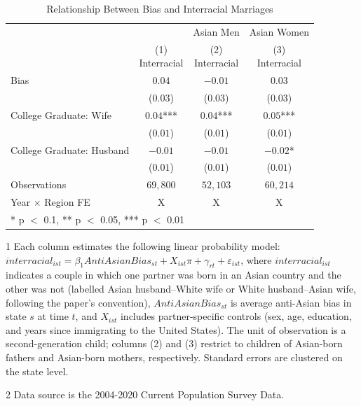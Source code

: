 \begin{table}[H]
\centering\centering
\caption{Relationship Between Bias and Interracial Marriages \label{regtab-logit-02}}
\centering
\begin{threeparttable}
\begin{tabular}[t]{lccc}
\toprule
\multicolumn{2}{c}{ } & \multicolumn{1}{c}{Asian Men} & \multicolumn{1}{c}{Asian Women} \\
\cmidrule(l{3pt}r{3pt}){3-3} \cmidrule(l{3pt}r{3pt}){4-4}
  & \specialcell{(1) \\ Interracial} & \specialcell{(2) \\ Interracial} & \specialcell{(3) \\ Interracial}\\
\midrule
Bias & $0.04$ & $-0.01$ & $0.03$\\
 & ($0.03$) & ($0.03$) & ($0.03$)\\
College Graduate: Wife & $0.04$*** & $0.04$*** & $0.05$***\\
 & ($0.01$) & ($0.01$) & \vphantom{1} ($0.01$)\\
College Graduate: Husband & $-0.01$ & $-0.01$ & $-0.02$*\\
 & ($0.01$) & ($0.01$) & ($0.01$)\\
\midrule
Observations & $69,800$ & $52,103$ & $60,214$\\
Year $\times$ Region FE & X & X & X\\
\bottomrule
\multicolumn{4}{l}{\rule{0pt}{1em}* p $<$ 0.1, ** p $<$ 0.05, *** p $<$ 0.01}\\
\end{tabular}
\begin{tablenotes}
\small
\item[1] \footnotesize{Each column estimates the following linear probability model: $interracial_{ist} = \beta_1 AntiAsianBias_{st} + X_{ist}\pi + \gamma_{rt} + \varepsilon_{ist}$, where $interracial_{ist}$ indicates a couple in which one partner was born in an Asian country and the other was not (labelled Asian husband--White wife or White husband--Asian wife, following the paper's convention), $AntiAsianBias_{st}$ is average anti-Asian bias in state $s$ at time $t$, and $X_{ist}$ includes partner-specific controls (sex, age, education, and years since immigrating to the United States). The unit of observation is a second-generation child; columns (2) and (3) restrict to children of Asian-born fathers and Asian-born mothers, respectively. Standard errors are clustered on the state level.}
\item[2] \footnotesize{Data source is the 2004-2020 Current Population Survey Data.}
\end{tablenotes}
\end{threeparttable}
\end{table}
